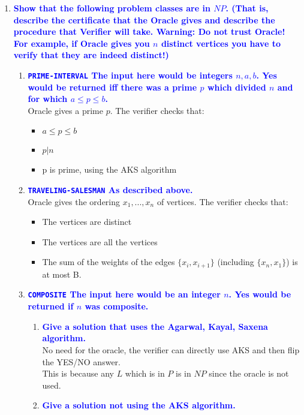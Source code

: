 \documentclass[11pt]{article}
\begin{document}
\begin{enumerate}
\item \textbf{\textcolor{blue}{Show that the following problem classes are in $NP$. (That is, describe the certificate that the Oracle gives and describe the procedure that Verifier will take. Warning: Do not trust Oracle! For example, if Oracle gives you $n$ distinct vertices you have to verify that they are indeed distinct!)}}
\begin{enumerate}
    \item \textbf{\textcolor{blue}{{\tt PRIME-INTERVAL} The input here would be integers $n,a,b$. Yes would be returned iff there was a prime $p$ which divided $n$ and for which $a\leq p\leq b$.}}
        \\ Oracle gives a prime $p$. The verifier checks that:
        \begin{itemize}
            \item $a \leq p \leq b$
            \item $p | n$
            \item p is prime, using the AKS algorithm
        \end{itemize}
    \item \textbf{\textcolor{blue}{{\tt TRAVELING-SALESMAN} As described above.}}
        \\ Oracle gives the ordering $x_1, ..., x_n$ of vertices. The verifier checks that:
        \begin{itemize}
            \item The vertices are distinct
            \item The vertices are all the vertices
            \item The sum of the weights of the edges $\{x_i, x_{i+1}\}$ (including $\{x_n, x_1\}$) is at most B.
        \end{itemize}
    \item \textbf{\textcolor{blue}{{\tt COMPOSITE} The input here would be an integer $n$. Yes would be returned if $n$ was composite.}}
    \begin{enumerate}
        \item \textbf{\textcolor{blue}{Give a solution that uses the Agarwal, Kayal, Saxena algorithm.}}
            \\ No need for the oracle, the verifier can directly use AKS and then flip the YES/NO answer.
            \\ This is because any $L$ which is in $P$ is in $NP$ since the oracle is not used.
        \item \textbf{\textcolor{blue}{Give a solution not using the AKS algorithm.}}

\end{enumerate}
\end{enumerate}
\end{enumerate}
\end{document}
